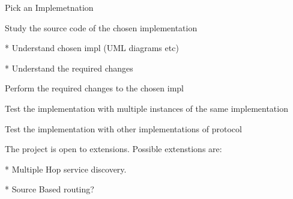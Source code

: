 \documentclass[12pt]{report}
\begin{document}
Pick an Implemetnation 

\em 

Study the source code of the chosen implementation

	* Understand chosen impl (UML diagrams etc)

	* Understand the required changes

Perform the required changes to the chosen impl 

Test the implementation with multiple instances of the same implementation

Test the implementation with other implementations of protocol 

The project is open to extensions. Possible extenstions are:

* Multiple Hop service discovery.

* Source Based routing?
\end{document}
